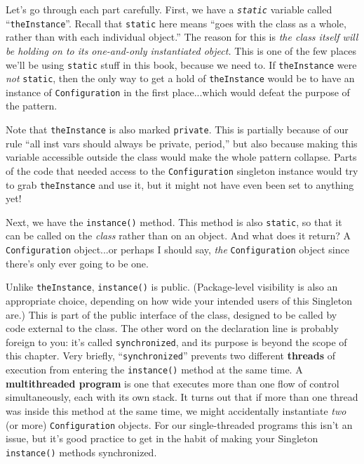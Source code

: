 Let's go through each part carefully. First, we have a
\textit{\texttt{static}} variable called ``\texttt{theInstance}''. Recall that
\texttt{static} here means ``goes with the class as a whole, rather than with
each individual object.'' The reason for this is \textit{the class itself will
be holding on to its one-and-only instantiated object.} This is one of the few
places we'll be using \texttt{static} stuff in this book, because we need to.
If \texttt{theInstance} were \textit{not} \texttt{static}, then the only way
to get a hold of \texttt{theInstance} would be to have an instance of
\texttt{Configuration} in the first place...which would defeat the purpose of
the pattern.

Note that \texttt{theInstance} is also marked \texttt{private}. This is
partially because of our rule ``all inst vars should always be private,
period,'' but also because making this variable accessible outside the class
would make the whole pattern collapse. Parts of the code that needed access to
the \texttt{Configuration} singleton instance would try to grab
\texttt{theInstance} and use it, but it might not have even been set to
anything yet!

Next, we have the \texttt{instance()} method. This method is also
\texttt{static}, so that it can be called on the \textit{class} rather than on
an object. And what does it return? A \texttt{Configuration} object...or
perhaps I should say, \textit{the} \texttt{Configuration} object since there's
only ever going to be one.

Unlike \texttt{theInstance}, \texttt{instance()} is public. (Package-level
visibility is also an appropriate choice, depending on how wide your intended
users of this Singleton are.) This is part of the public interface of the
class, designed to be called by code external to the class. The other word on
the declaration line is probably foreign to you: it's called
\texttt{synchronized}, and its purpose is beyond the scope of this chapter.
Very briefly, ``\texttt{synchronized}'' prevents two different \textbf{threads}
of execution from entering the \texttt{instance()} method at the same time.
A \textbf{multithreaded program} is one that executes more than one flow of
control simultaneously, each with its own stack. It turns out that if more
than one thread was inside this method at the same time, we might accidentally
instantiate \textit{two} (or more) \texttt{Configuration} objects. For our
single-threaded programs this isn't an issue, but it's good practice to get in
the habit of making your Singleton \texttt{instance()} methods synchronized.

